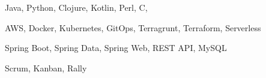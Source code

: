 
\begin{cvskills}

    {Java, Python, Clojure, Kotlin, Perl, C, \CC{}} %

    {AWS, Docker, Kubernetes, GitOps, Terragrunt, Terraform, Serverless} %

    {Spring Boot, Spring Data, Spring Web, REST API, MySQL} %

    {Scrum, Kanban, Rally} %

\end{cvskills}
